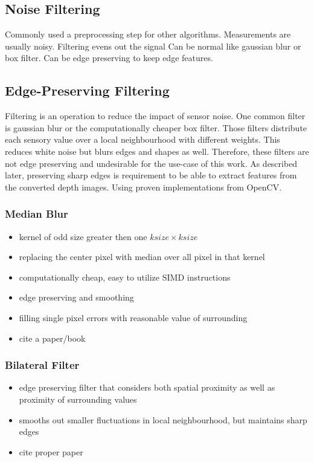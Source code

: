 \subsection{Noise Filtering}

Commonly used a preprocessing step for other algorithms.
Measurements are usually noisy. Filtering evens out the signal
Can be normal like gaussian blur or box filter.
Can be edge preserving to keep edge features.

\subsection{Edge-Preserving Filtering}

Filtering is an operation to reduce the impact of sensor noise.
One common filter is gaussian blur or the computationally cheaper box filter.
Those filters distribute each sensory value over a local neighbourhood with different weights.
This reduces white noise but blurs edges and shapes as well.
Therefore, these filters are not edge preserving and undesirable for the use-case of this work.
As described later, preserving sharp edges is requirement to be able to extract features from the converted depth images.
Using proven implementations from OpenCV\cite{opencv_library}.

\subsubsection{Median Blur}

\begin{itemize}
    \item kernel of odd size greater then one $ksize \times ksize$
    \item replacing the center pixel with median over all pixel in that kernel
    \item computationally cheap, easy to utilize SIMD instructions
    \item edge preserving and smoothing
    \item filling single pixel errors with reasonable value of surrounding
    \item cite a paper/book
\end{itemize}

\subsubsection{Bilateral Filter}

\begin{itemize}
    \item edge preserving filter that considers both spatial proximity as well as proximity of surrounding values
    \item smooths out smaller fluctuations in local neighbourhood, but maintains sharp edges
    \item cite proper paper
\end{itemize}

